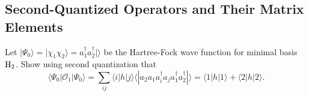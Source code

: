 \documentclass[a4paper]{book}
\newcounter{exercise}[chapter]
\newcounter{solution}[chapter]
\begin{document}
	\subsection{Second-Quantized Operators and Their Matrix Elements}
	
	\begin{exercise}
	Let $| \Psi_0 \rangle = | \chi_1 \chi_2 \rangle = a^\dagger_1 a^\dagger_2 | \rangle$ be the Hartree-Fock wave function for minimal basis $\ce{H2}$. Show using second quantization that
	\[
		\langle \Psi_0 | \mathscr{O}_1 | \Psi_0 \rangle = \sum_{ij} \langle i | h | j \rangle \langle | a_2 a_1 a^\dagger_i a_j a^\dagger_1 a^\dagger_2 | \rangle = \langle 1 | h | 1 \rangle + \langle 2 | h | 2 \rangle.
	\]
	\end{exercise}
	
	\begin{solution}
	

\end{solution}
\end{document}
